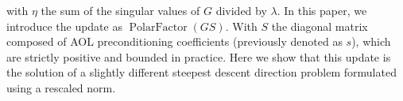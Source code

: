     \noindent with $\eta$ the sum of the singular values of $G$ divided by $\lambda$. In this paper, we introduce the \turbomuon update as $\operatorname{PolarFactor}(G S)$. With $S$ the diagonal matrix composed of AOL preconditioning coefficients (previously denoted as $s$), which are strictly positive and bounded in practice. Here we show that this update is the solution of a slightly different steepest descent direction problem formulated using a rescaled norm.
    
        
    
    

